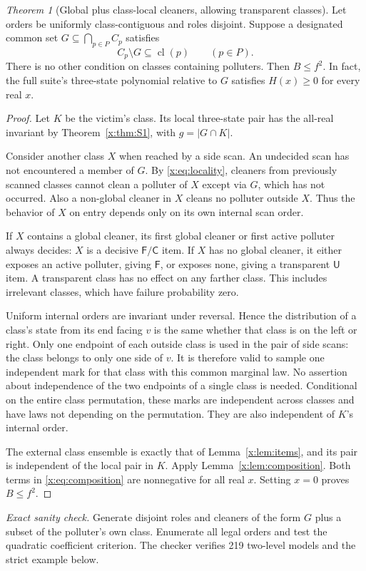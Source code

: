 \documentclass[11pt,a4paper]{article}
\theoremstyle{definition}\newtheorem{definition}[theorem]{Definition}
\theoremstyle{remark}\newtheorem{remark}[theorem]{Remark}
\newtheorem{xtheorem}{Theorem}\renewcommand{\thextheorem}{A.\arabic{xtheorem}}
\theoremstyle{definition}\newtheorem{xexample}[xtheorem]{Example}\theoremstyle{plain}
\newcommand{\Fail}{\mathsf F}\newcommand{\Clean}{\mathsf C}\newcommand{\Und}{\mathsf U}
\newcommand{\cl}{\operatorname{cl}}
\newcommand{\xcheck}[1]{\par\smallskip\textit{Exact sanity check.} #1\par}
\begin{document}
\begin{xtheorem}[Global plus class-local cleaners, allowing transparent classes]\label{x:thm:main}
Let orders be uniformly class-contiguous and roles disjoint. Suppose a designated common set $G\subseteq\bigcap_{p\in P} C_p$ satisfies
\begin{equation}\label{x:eq:locality}
C_p\setminus G\subseteq\cl(p)\qquad(p\in P).
\end{equation}
There is no other condition on classes containing polluters. Then $B\le f^2$. In fact, the full suite's three-state polynomial relative to $G$ satisfies $H(x)\ge0$ for every real $x$.
\end{xtheorem}
\begin{proof}
Let $K$ be the victim's class. Its local three-state pair has the all-real invariant by Theorem~\ref{x:thm:S1}, with $g=|G\cap K|$.

Consider another class $X$ when reached by a side scan. An undecided scan has not encountered a member of $G$. By \eqref{x:eq:locality}, cleaners from previously scanned classes cannot clean a polluter of $X$ except via $G$, which has not occurred. Also a non-global cleaner in $X$ cleans no polluter outside $X$. Thus the behavior of $X$ on entry depends only on its own internal scan order.

If $X$ contains a global cleaner, its first global cleaner or first active polluter always decides: $X$ is a decisive $\Fail/\Clean$ item. If $X$ has no global cleaner, it either exposes an active polluter, giving $\Fail$, or exposes none, giving a transparent $\Und$ item. A transparent class has no effect on any farther class. This includes irrelevant classes, which have failure probability zero.

Uniform internal orders are invariant under reversal. Hence the distribution of a class's state from its end facing $v$ is the same whether that class is on the left or right. Only one endpoint of each outside class is used in the pair of side scans: the class belongs to only one side of $v$. It is therefore valid to sample one independent mark for that class with this common marginal law. No assertion about independence of the two endpoints of a single class is needed. Conditional on the entire class permutation, these marks are independent across classes and have laws not depending on the permutation. They are also independent of $K$'s internal order.

The external class ensemble is exactly that of Lemma~\ref{x:lem:items}, and its pair is independent of the local pair in $K$. Apply Lemma~\ref{x:lem:composition}. Both terms in \eqref{x:eq:composition} are nonnegative for all real $x$. Setting $x=0$ proves $B\le f^2$.
\end{proof}
\xcheck{Generate disjoint roles and cleaners of the form $G$ plus a subset of the polluter's own class. Enumerate all legal orders and test the quadratic coefficient criterion. The checker verifies 219 two-level models and the strict example below.}
\end{document}
